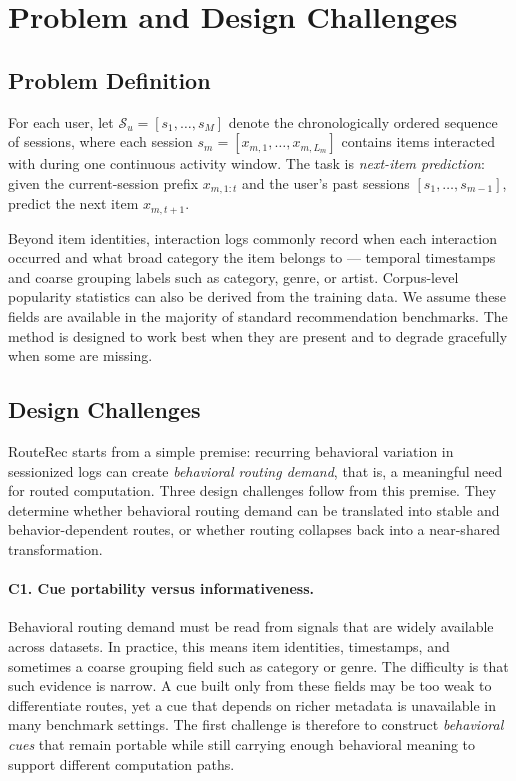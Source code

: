 \documentclass[sigconf,review,anonymous]{acmart}
\begin{document}
\section{Problem and Design Challenges}
\label{sec:problem}

\subsection{Problem Definition}

For each user, let $\mathcal{S}_u=[s_1,\dots,s_M]$ denote the chronologically ordered sequence of sessions, where each session $s_m=[x_{m,1},\dots,x_{m,L_m}]$ contains items interacted with during one continuous activity window. The task is \emph{next-item prediction}: given the current-session prefix $x_{m,1:t}$ and the user's past sessions $[s_1,\dots,s_{m-1}]$, predict the next item $x_{m,t+1}$.

Beyond item identities, interaction logs commonly record when each interaction occurred and what broad category the item belongs to --- temporal timestamps and coarse grouping labels such as category, genre, or artist. Corpus-level popularity statistics can also be derived from the training data. We assume these fields are available in the majority of standard recommendation benchmarks. The method is designed to work best when they are present and to degrade gracefully when some are missing.


\subsection{Design Challenges}
RouteRec starts from a simple premise: recurring behavioral variation in sessionized logs can create \emph{behavioral routing demand}, that is, a meaningful need for routed computation. Three design challenges follow from this premise. They determine whether behavioral routing demand can be translated into stable and behavior-dependent routes, or whether routing collapses back into a near-shared transformation.

\paragraph{\textbf{C1. Cue portability versus informativeness.}}
Behavioral routing demand must be read from signals that are widely available across datasets. In practice, this means item identities, timestamps, and sometimes a coarse grouping field such as category or genre. The difficulty is that such evidence is narrow. A cue built only from these fields may be too weak to differentiate routes, yet a cue that depends on richer metadata is unavailable in many benchmark settings. The first challenge is therefore to construct \emph{behavioral cues} that remain portable while still carrying enough behavioral meaning to support different computation paths.
\end{document}
